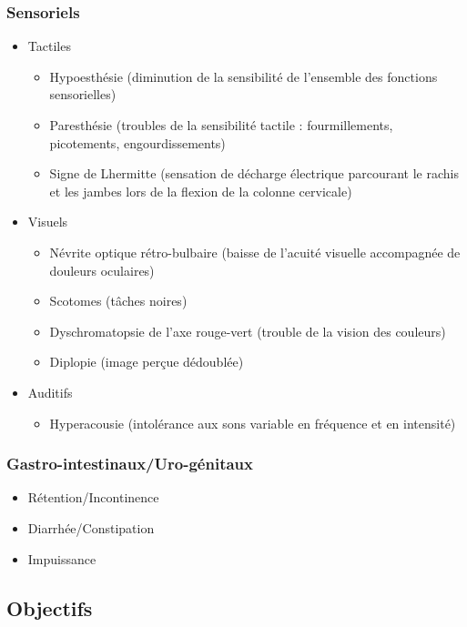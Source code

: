\documentclass[a4paper,12pt,francais]{article}
\begin{document}
\subsubsection{Sensoriels}
\begin{itemize}
    \item Tactiles
        \begin{itemize}
            \item Hypoesthésie (diminution de la sensibilité de l'ensemble des fonctions sensorielles)
            \item Paresthésie (troubles de la sensibilité tactile : fourmillements, picotements, engourdissements)
            \item Signe de Lhermitte (sensation de décharge électrique parcourant le rachis et les jambes lors de la flexion de la colonne cervicale)
        \end{itemize}
    \item Visuels
        \begin{itemize}
            \item Névrite optique rétro-bulbaire (baisse de l'acuité visuelle accompagnée de douleurs oculaires)
            \item Scotomes (tâches noires)
            \item Dyschromatopsie de l'axe rouge-vert (trouble de la vision des couleurs)
            \item Diplopie (image perçue dédoublée)
        \end{itemize}
    \item Auditifs
        \begin{itemize}
            \item Hyperacousie (intolérance aux sons variable en fréquence et en intensité)
        \end{itemize}
\end{itemize}
\subsubsection{Gastro-intestinaux/Uro-génitaux}
\begin{itemize}
    \item Rétention/Incontinence
    \item Diarrhée/Constipation
    \item Impuissance
\end{itemize}
\subsection{Objectifs} %
\end{document}
